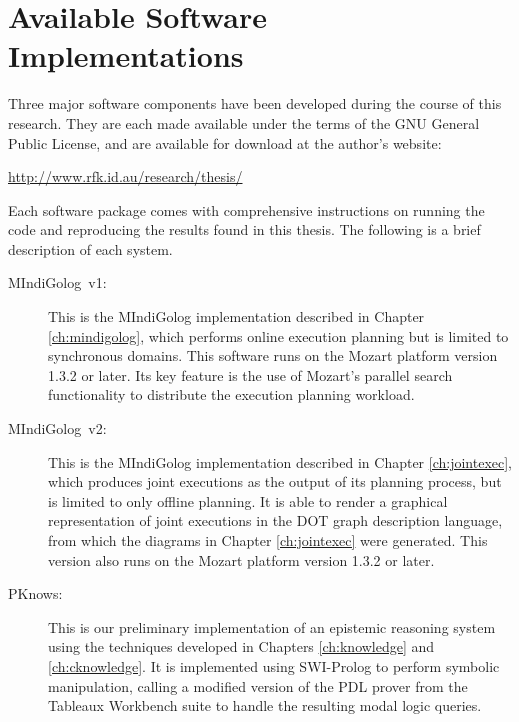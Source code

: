 

\chapter{Available Software Implementations}

\label{ch:implementation}

Three major software components have been developed during the course
of this research. They are each made available under the terms of
the GNU General Public License, and are available for download at
the author's website:

\begin{center}
\url{http://www.rfk.id.au/research/thesis/}
\par\end{center}

Each software package comes with comprehensive instructions on running
the code and reproducing the results found in this thesis. The following
is a brief description of each system.

\begin{description}
\item [{MIndiGolog~v1:}] This is the MIndiGolog implementation described
in Chapter \ref{ch:mindigolog}, which performs online execution planning
but is limited to synchronous domains. This software runs on the Mozart
platform version 1.3.2 or later. Its key feature is the use of Mozart's
parallel search functionality to distribute the execution planning
workload.
\item [{MIndiGolog~v2:}] This is the MIndiGolog implementation described
in Chapter \ref{ch:jointexec}, which produces joint executions as
the output of its planning process, but is limited to only offline
planning. It is able to render a graphical representation of joint
executions in the DOT graph description language, from which the diagrams
in Chapter \ref{ch:jointexec} were generated. This version also runs
on the Mozart platform version 1.3.2 or later.
\item [{PKnows:}] This is our preliminary implementation of an epistemic
reasoning system using the techniques developed in Chapters \ref{ch:knowledge}
and \ref{ch:cknowledge}. It is implemented using SWI-Prolog to perform
symbolic manipulation, calling a modified version of the PDL prover
from the Tableaux Workbench suite \citep{abate07twb_desc} to handle
the resulting modal logic queries.
\end{description}
